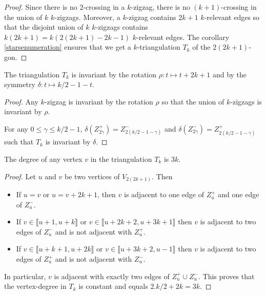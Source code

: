 \documentclass[12pt]{amsart}
\begin{document}
\begin{proof}
Since there is no $2$-crossing in a $k$-zigzag, there is no $(k+1)$-crossing in the union of $k$ $k$-zigzags. Moreover, a $k$-zigzag contains $2k+1$ $k$-relevant edges so that the disjoint union of $k$ $k$-zigzags contains $k(2k+1)=k(2(2k+1)-2k-1)$ $k$-relevant edges. The corollary \ref{starsenumeration} ensures that we get a $k$-triangulation $T_k$ of the $2(2k+1)$-gon.
\end{proof}

\begin{lemma}\label{transformation}
The triangulation $T_k$ is invariant by the rotation $\rho: t\mapsto t+2k+1$ and by the symmetry $\delta: t\mapsto k/2-1-t$.
\end{lemma}

\begin{proof}
Any $k$-zigzag is invariant by the rotation $\rho$ so that the union of $k$-zigzags is invariant by $\rho$.

For any $0\le\gamma\le k/2-1$, $\delta(Z^+_{2\gamma})=Z^-_{2(k/2-1-\gamma)}$ and $\delta(Z^-_{2\gamma})=Z^+_{2(k/2-1-\gamma)}$ such that $T_k$ is invariant by $\delta$.
\end{proof}

\begin{lemma}
The degree of any vertex $v$ in the triangulation $T_k$ is $3k$.
\end{lemma}

\begin{proof}
Let $u$ and $v$ be two vertices of $V_{2(2k+1)}$. Then
\begin{itemize}
\item If $u=v$ or $u=v+2k+1$, then $v$ is adjacent to one edge of $Z_u^+$ and one edge of $Z_u^-$.
\item If $v\in\llbracket u+1,u+k\rrbracket$ or $v\in\llbracket u+2k+2,u+3k+1\rrbracket$ then $v$ is adjacent to two edges of $Z_u^-$ and is not adjacent with $Z_u^+$.
\item If $v\in\llbracket u+k+1,u+2k\rrbracket$ or $v\in\llbracket u+3k+2,u-1\rrbracket$ then $v$ is adjacent to two edges of $Z_u^+$ and is not adjacent with $Z_u^-$.
\end{itemize}
In particular, $v$ is adjacent with exactly two edges of $Z_u^+\cup Z_u^-$. This proves that the vertex-degree in $T_k$ is constant and equals $2.k/2+2k=3k$.
\end{proof}
\end{document}
